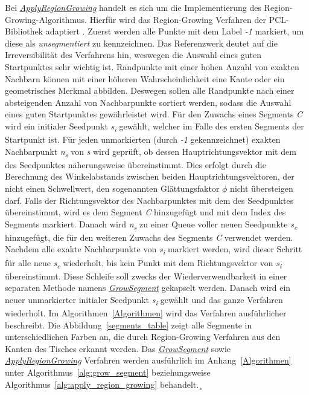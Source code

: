 Bei \textit{\hyperref[alg:apply_region_growing]{ApplyRegionGrowing}} handelt es sich um die Implementierung des Region-Growing-Algorithmus. Hierfür wird das Region-Growing Verfahren der PCL-Bibliothek adaptiert \autocite{rusu_3d_2011}. Zuerst werden alle Punkte mit dem Label \textit{-1} markiert, um diese als \textit{unsegmentiert} zu kennzeichnen. Das Referenzwerk deutet auf die Irreversibilität des Verfahrens hin, weswegen die Auswahl eines guten Startpunktes sehr wichtig ist. Randpunkte mit einer hohen Anzahl von exakten Nachbarn können mit einer höheren Wahrscheinlichkeit eine Kante oder ein geometrisches Merkmal abbilden. Deswegen sollen alle Randpunkte nach einer absteigenden Anzahl von Nachbarpunkte sortiert werden, sodass die Auswahl eines guten Startpunktes gewährleistet wird. Für den Zuwachs eines Segments \textit{C} wird ein initialer Seedpunkt \textit{s\textsubscript{i}} gewählt, welcher im Falle des ersten Segments der Startpunkt ist. Für jeden unmarkierten (durch \textit{-1} gekennzeichnet) exakten Nachbarpunkt \textit{n\textsubscript{s}} von \textit{s} wird geprüft, ob dessen Hauptrichtungsvektor mit dem des Seedpunktes näherungsweise übereinstimmt. Dies erfolgt durch die Berechnung des Winkelabstands zwischen beiden Hauptrichtungsvektoren, der nicht einen Schwellwert, den sogenannten Glättungsfaktor $\phi$ nicht übersteigen darf. Falls der Richtungsvektor des Nachbarpunktes mit dem des Seedpunktes übereinstimmt, wird es dem Segment \textit{C} hinzugefügt und mit dem Index des Segments markiert. Danach wird \textit{n\textsubscript{s}} zu einer Queue voller neuen Seedpunkte \textit{s\textsubscript{c}} hinzugefügt, die für den weiteren Zuwachs des Segments \textit{C} verwendet werden. Nachdem alle exakte Nachbarpunkte von \textit{s\textsubscript{i}} markiert werden, wird dieser Schritt für alle neue \textit{s\textsubscript{c}} wiederholt, bis kein Punkt mit dem Richtungsvektor von \textit{s\textsubscript{i}} übereinstimmt. Diese Schleife soll zwecks der Wiederverwendbarkeit in einer separaten Methode namens \textit{\hyperref[alg:grow_segment]{GrowSegment}} gekapselt werden. Danach wird ein neuer unmarkierter initialer Seedpunkt \textit{s\textsubscript{i}} gewählt und das ganze Verfahren wiederholt. Im Algorithmen~\ref{Algorithmen} wird das Verfahren ausführlicher beschreibt. Die Abbildung~\ref{segments_table} zeigt alle Segmente in unterschiedlichen Farben an, die durch Region-Growing Verfahren aus den Kanten des Tisches erkannt werden. Das \textit{\hyperref[alg:grow_segment]{GrowSegment}} sowie \textit{\hyperref[alg:apply_region_growing]{ApplyRegionGrowing}} Verfahren werden ausführlich im Anhang~\ref{Algorithmen} unter Algorithmus~\ref{alg:grow_segment} beziehungsweise Algorithmus~\ref{alg:apply_region_growing} behandelt.¸


